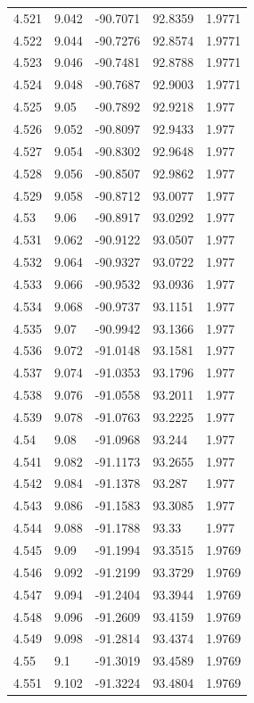 \begin{tabular}{lllll}
4.521 & 9.042 & -90.7071 & 92.8359 & 1.9771 \\
4.522 & 9.044 & -90.7276 & 92.8574 & 1.9771 \\
4.523 & 9.046 & -90.7481 & 92.8788 & 1.9771 \\
4.524 & 9.048 & -90.7687 & 92.9003 & 1.9771 \\
4.525 & 9.05 & -90.7892 & 92.9218 & 1.977 \\
4.526 & 9.052 & -90.8097 & 92.9433 & 1.977 \\
4.527 & 9.054 & -90.8302 & 92.9648 & 1.977 \\
4.528 & 9.056 & -90.8507 & 92.9862 & 1.977 \\
4.529 & 9.058 & -90.8712 & 93.0077 & 1.977 \\
4.53 & 9.06 & -90.8917 & 93.0292 & 1.977 \\
4.531 & 9.062 & -90.9122 & 93.0507 & 1.977 \\
4.532 & 9.064 & -90.9327 & 93.0722 & 1.977 \\
4.533 & 9.066 & -90.9532 & 93.0936 & 1.977 \\
4.534 & 9.068 & -90.9737 & 93.1151 & 1.977 \\
4.535 & 9.07 & -90.9942 & 93.1366 & 1.977 \\
4.536 & 9.072 & -91.0148 & 93.1581 & 1.977 \\
4.537 & 9.074 & -91.0353 & 93.1796 & 1.977 \\
4.538 & 9.076 & -91.0558 & 93.2011 & 1.977 \\
4.539 & 9.078 & -91.0763 & 93.2225 & 1.977 \\
4.54 & 9.08 & -91.0968 & 93.244 & 1.977 \\
4.541 & 9.082 & -91.1173 & 93.2655 & 1.977 \\
4.542 & 9.084 & -91.1378 & 93.287 & 1.977 \\
4.543 & 9.086 & -91.1583 & 93.3085 & 1.977 \\
4.544 & 9.088 & -91.1788 & 93.33 & 1.977 \\
4.545 & 9.09 & -91.1994 & 93.3515 & 1.9769 \\
4.546 & 9.092 & -91.2199 & 93.3729 & 1.9769 \\
4.547 & 9.094 & -91.2404 & 93.3944 & 1.9769 \\
4.548 & 9.096 & -91.2609 & 93.4159 & 1.9769 \\
4.549 & 9.098 & -91.2814 & 93.4374 & 1.9769 \\
4.55 & 9.1 & -91.3019 & 93.4589 & 1.9769 \\
4.551 & 9.102 & -91.3224 & 93.4804 & 1.9769 \\

\end{tabular}
